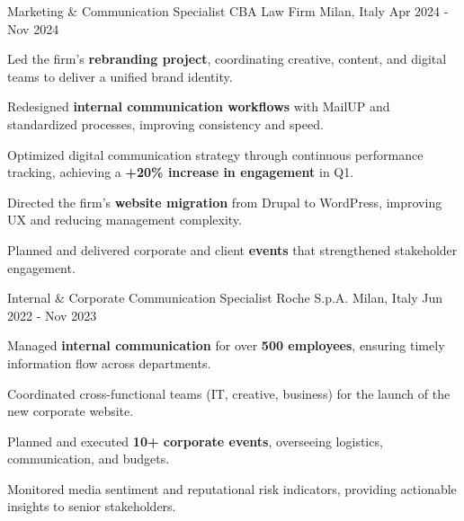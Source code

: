 \begin{cventries}
\cventry
{Marketing \& Communication Specialist} %
{CBA Law Firm} %
{Milan, Italy} %
{Apr 2024 - Nov 2024} %
{
\begin{cvitems}
\item Led the firm's \textbf{rebranding project}, coordinating creative, content, and digital teams to deliver a unified brand identity.
\item Redesigned \textbf{internal communication workflows} with MailUP and standardized processes, improving consistency and speed.
\item Optimized digital communication strategy through continuous performance tracking, achieving a \textbf{+20\% increase in engagement} in Q1.
\item Directed the firm's \textbf{website migration} from Drupal to WordPress, improving UX and reducing management complexity.
\item Planned and delivered corporate and client \textbf{events} that strengthened stakeholder engagement.
\end{cvitems}
}

\cventry
{Internal \& Corporate Communication Specialist} %
{Roche S.p.A.} %
{Milan, Italy} %
{Jun 2022 - Nov 2023} %
{
\begin{cvitems}
\item Managed \textbf{internal communication} for over \textbf{500 employees}, ensuring timely information flow across departments.
\item Coordinated cross-functional teams (IT, creative, business) for the launch of the new corporate website.
\item Planned and executed \textbf{10+ corporate events}, overseeing logistics, communication, and budgets.
\item Monitored media sentiment and reputational risk indicators, providing actionable insights to senior stakeholders.
\end{cvitems}
}

\end{cventries}
